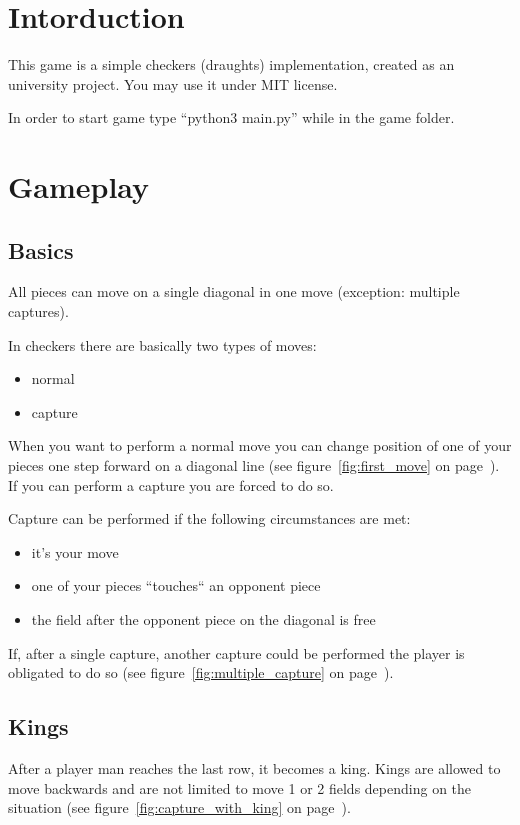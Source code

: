 \documentclass[12pt,a5paper]{article}
\begin{document}
\tableofcontents
\listoffigures

\newpage
\section{Intorduction}

This game is a simple checkers (draughts) implementation, created as an university project. You may use it under MIT license.

In order to start game type “python3 main.py” while in the game folder.

\newpage
\section{Gameplay}

\subsection{Basics}
All pieces can move on a single diagonal in one move (exception: multiple captures).

In checkers there are basically two types of moves:
\begin{itemize}
	\item normal
	\item capture
\end{itemize}

When you want to perform a normal move you can change position of one of your pieces one step forward on a diagonal line (see figure~\ref{fig:first_move} on page~\pageref{fig:first_move}).
If you can perform a capture you are forced to do so.

Capture can be performed if the following circumstances are met:
\begin{itemize}
	\item it's your move
	\item one of your pieces “touches“ an opponent piece
	\item the field after the opponent piece on the diagonal is free
\end{itemize}
If, after a single capture, another capture could be performed the player is obligated to do so (see figure~\ref{fig:multiple_capture} on page~\pageref{fig:multiple_capture}).

\subsection{Kings}
After a player man reaches the last row, it becomes a king. Kings are allowed to move backwards and are not limited to move 1 or 2 fields depending on the situation (see figure~\ref{fig:capture_with_king} on page~\pageref{fig:capture_with_king}).
\end{document}

